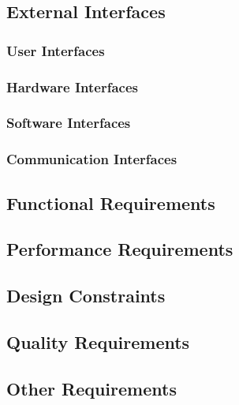 \subsection{External Interfaces}
\label{requirements:interfaces}

	\subsubsection*{User Interfaces}
	\label{requirements:interfaces:user}
	
	\subsubsection*{Hardware Interfaces}
	\label{requirements:interfaces:hardware}
	
	\subsubsection*{Software Interfaces}
	\label{requirements:interfaces:software}

	\subsubsection*{Communication Interfaces}
	\label{requirements:interfaces:communication}
	

\subsection{Functional Requirements}
\label{requirements:functional}


\subsection{Performance Requirements}
\label{requirements:performance}


\subsection{Design Constraints}
\label{requirements:constraints}


\subsection{Quality Requirements}
\label{requirements:quality}


\subsection{Other Requirements}
\label{requirements:other}